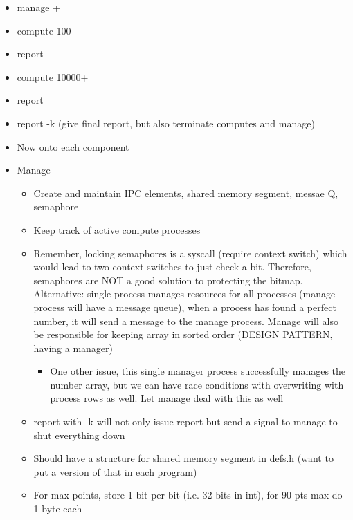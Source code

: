 \begin{itemize}
    \item manage +
    \item compute 100 +
    \item report
    \item compute 10000+
    \item report
    \item report -k (give final report, but also terminate computes and manage)
    \item Now onto each component
    \item Manage
    \begin{itemize}
        \item Create and maintain IPC elements, shared memory segment, messae Q, semaphore
        \item Keep track of active compute processes  
        \item Remember, locking semaphores is a syscall (require context switch) which would lead to two context switches to just check a bit. Therefore, semaphores are NOT a good solution to protecting the bitmap. Alternative: single process manages resources for all processes (manage process will have a message queue), when a process has found a perfect number, it will send a message to the manage process. Manage will also be responsible for keeping array in sorted order (DESIGN PATTERN, having a manager)
        \begin{itemize}
            \item One other issue, this single manager process successfully manages the number array, but we can have race conditions with overwriting with process rows as well. Let manage deal with this as well
        \end{itemize}
        \item report with -k will not only issue report but send a signal to manage to shut everything down
        \item Should have a structure for shared memory segment in defs.h (want to put a version of that in each program)
        \item For max points, store 1 bit per bit (i.e. 32 bits in int), for 90 pts max do 1 byte each
    \end{itemize}
\end{itemize}